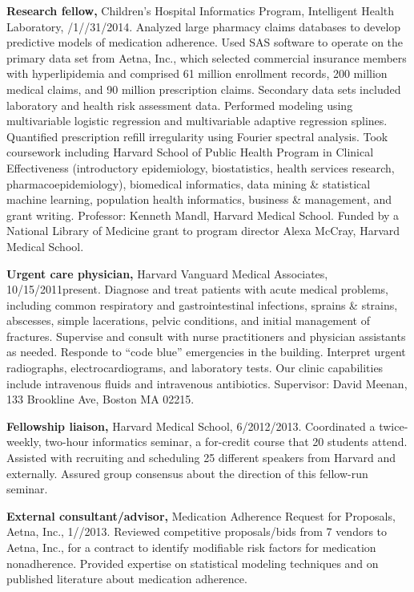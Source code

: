 \documentclass[12pt]{article}
\begin{document}
\textbf{Research fellow,} Children’s Hospital Informatics Program,
Intelligent Health Lab\-o\-ra\-to\-ry,
/1/\ndash{}/31/2014.
Analyzed large pharmacy claims databases to develop predictive models
of medication adherence. Used SAS software to operate on the primary
data set from Aetna, Inc., which selected commercial insurance members
with hyperlipidemia and comprised 61 million enrollment records, 200
million medical claims, and 90 million prescription claims. Secondary
data sets included laboratory and health risk assessment data. Performed
modeling using multivariable logistic regression and multivariable
adaptive regression splines. Quantified prescription refill irregularity
using Fourier spectral analysis.
Took coursework including Harvard School of Public Health Program in
Clinical Effectiveness (introductory epidemiology, biostatistics,
health services research, pharmacoepidemiology), biomedical
informatics, data mining \& statistical machine learning, population
health informatics, business \& management, and grant writing.
Professor: Kenneth Mandl, Harvard Medical School. Funded by a National
Library of Medicine grant to program director Alexa McCray, Harvard
Medical School.

\textbf{Urgent care physician,} Harvard Vanguard Medical Associates,
10/15/2011\ndash{}present. Diagnose and treat patients with acute
medical problems, including common respiratory and gastrointestinal
infections, sprains \& strains, abscesses, simple lacerations, pelvic
conditions, and initial management of fractures. Supervise and consult
with nurse practitioners and physician assistants as needed. Responde
to ``code blue'' emergencies in the building. Interpret
urgent radiographs, electrocardiograms, and laboratory tests. Our
clinic capabilities include intravenous fluids and intravenous
antibiotics. Supervisor: David Meenan, 133 Brookline Ave, Boston MA
02215.

\textbf{Fellowship liaison,} Harvard Medical School,
6/2012/2013. Coordinated a twice-week\-ly, two-hour
informatics seminar, a for-credit course that 20 students attend.
Assisted with recruiting and scheduling 25 different speakers from
Harvard and externally. Assured group consensus about the direction of
this fellow-run seminar.

\textbf{External consultant/advisor,} Medication Adherence Request for
Proposals, Aetna, Inc.,
1/\ndash{}/2013. Reviewed competitive
proposals/bids from 7 vendors to Aetna, Inc., for a contract to
identify modifiable risk factors for medication nonadherence. Provided
expertise on statistical modeling techniques and on published
literature about medication adherence.
\end{document}
